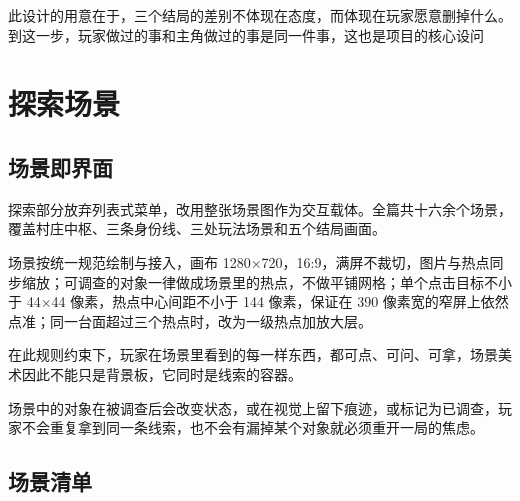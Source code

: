 此设计的用意在于，三个结局的差别不体现在态度，而体现在玩家愿意删掉什么。到这一步，玩家做过的事和主角做过的事是同一件事，这也是项目的核心设问

\section{探索场景}

\subsection{场景即界面}

探索部分放弃列表式菜单，改用整张场景图作为交互载体。全篇共十六余个场景，覆盖村庄中枢、三条身份线、三处玩法场景和五个结局画面。

场景按统一规范绘制与接入，画布 1280×720，16:9，满屏不裁切，图片与热点同步缩放；可调查的对象一律做成场景里的热点，不做平铺网格；单个点击目标不小于 44×44 像素，热点中心间距不小于 144 像素，保证在 390 像素宽的窄屏上依然点准；同一台面超过三个热点时，改为一级热点加放大层。

在此规则约束下，玩家在场景里看到的每一样东西，都可点、可问、可拿，场景美术因此不能只是背景板，它同时是线索的容器。

场景中的对象在被调查后会改变状态，或在视觉上留下痕迹，或标记为已调查，玩家不会重复拿到同一条线索，也不会有漏掉某个对象就必须重开一局的焦虑。

\subsection{场景清单}

